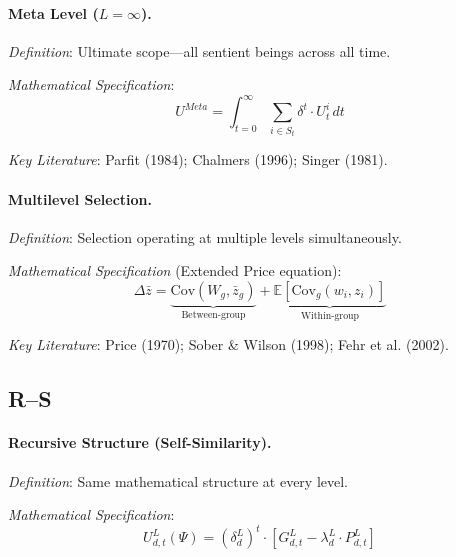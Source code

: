 \medskip

\paragraph{Meta Level ($L = \infty$).}
\textit{Definition}: Ultimate scope---all sentient beings across all time.

\textit{Mathematical Specification}:
\begin{equation}
U^{Meta} = \int_{t=0}^{\infty} \sum_{i \in S_t} \delta^t \cdot U^i_t \, dt
\end{equation}

\textit{Key Literature}: Parfit (1984); Chalmers (1996); Singer (1981).

\medskip

\paragraph{Multilevel Selection.}
\textit{Definition}: Selection operating at multiple levels simultaneously.

\textit{Mathematical Specification} (Extended Price equation):
\begin{equation}
\Delta \bar{z} = \underbrace{\text{Cov}(W_g, \bar{z}_g)}_{\text{Between-group}} + 
\underbrace{\mathbb{E}[\text{Cov}_g(w_i, z_i)]}_{\text{Within-group}}
\end{equation}

\textit{Key Literature}: Price (1970); Sober \& Wilson (1998); Fehr et al. (2002).

\subsection*{R--S}

\paragraph{Recursive Structure (Self-Similarity).}
\textit{Definition}: Same mathematical structure at every level.

\textit{Mathematical Specification}:
\begin{equation}
U^L_{d,t}(\Psi) = (\delta^L_d)^t \cdot [G^L_{d,t} - \lambda^L_d \cdot P^L_{d,t}]
\end{equation}

\medskip

